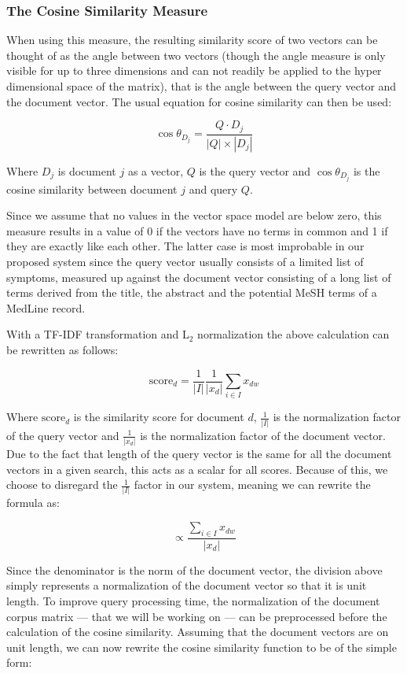 \subsubsection{The Cosine Similarity Measure}
When using this measure, the resulting similarity score of two vectors
can be thought of as the angle between two vectors (though the angle
measure is only visible for up to three dimensions and can not readily
be applied to the hyper dimensional space of the matrix), that is the
angle between the query vector and the document vector. The usual
equation for cosine similarity can then be used:

\[
\cos \theta_{D_j} = \frac{Q \cdot D_j}{|Q| \times |D_j|}
\]

Where $D_j$ is document $j$ as a vector, $Q$ is the query vector and
$\cos \theta_{D_{j}}$ is the cosine similarity between document $j$ and
query $Q$.

Since we assume that no values in the vector space model are
below zero, this measure results in a value of 0 if the vectors have
no terms in common and 1 if they are exactly like each other. The
latter case is most improbable in our proposed system since the query
vector usually consists of a limited list of symptoms, measured up
against the document vector consisting of a long list of terms derived
from the title, the abstract and the potential MeSH terms of a MedLine
record.

With a TF-IDF transformation and L$_2$ normalization the above
calculation can be rewritten as follows: 

\[
\textrm{score}_{d} = \frac{1}{|I|}\frac{1}{|x_{d}|} \sum_{i \in I} x_{dw}
\]

Where $\textrm{score}_{d}$ is the similarity score for document $d$,
$\frac{1}{|I|}$ is the normalization factor of the query vector and
$\frac{1}{|x_{d}|}$ is the normalization factor of the document
vector. Due to the fact that length of the query vector is the same
for all the document vectors in a given search, this acts as a scalar
for all scores. Because of this, we choose to disregard the
$\frac{1}{|I|}$ factor in our system, meaning we can rewrite the
formula as:

\[
\propto \frac{\sum_{i \in I} x_{dw}} {|x_{d}|}
\]

Since the denominator is the norm of the document vector, the division
above simply represents a normalization of the document vector so that
it is unit length. To improve query processing time, the
normalization of the document corpus matrix --- that we will be working
on --- can be preprocessed before the calculation of the cosine
similarity. Assuming that the document vectors are on unit length, we
can now rewrite the cosine similarity function to be of the simple
form: 


